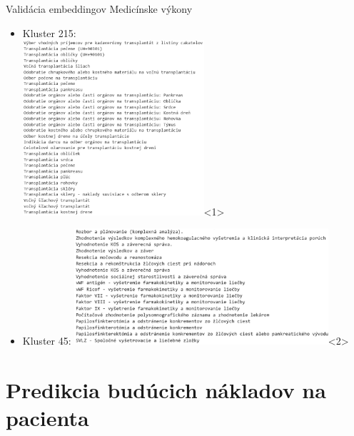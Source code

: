 \documentclass[slovak,10pt]{beamer}
\begin{document}
\begin{frame}{Validácia embeddingov}
	Medicínske výkony
	\begin{itemize}
		\item<1> Kluster 215:
		\\
		\includegraphics[height=6.5cm]{images/G215.png}<1>
		\item<2> Kluster 45:
		\includegraphics[height=4.3cm]{images/G45.png}<2>
	\end{itemize}
	
\end{frame}


\section{Predikcia budúcich nákladov na pacienta}
\end{document}
